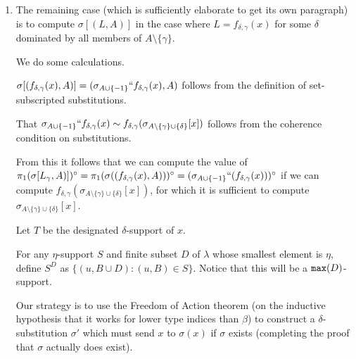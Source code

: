 \documentclass[12pt]{article}
\begin{document}
\begin{enumerate}
\item The remaining case (which is sufficiently elaborate to get its own paragraph)  is to compute $\sigma[(L,A)]$ in the case where $L = f_{\delta,\gamma}(x)$ for some $\delta$ dominated by all members of $A \setminus \{\gamma\}$.

We do some calculations.  

$\sigma[( f_{\delta,\gamma}(x),A)] = (\sigma_{A\cup \{-1\}}`` f_{\delta,\gamma}(x),A)$ follows from the definition of set-subscripted substitutions.

That $\sigma_{A\cup \{-1\}}`` f_{\delta,\gamma}(x) \sim f_{\delta,\gamma}(\sigma_{A\setminus \{\gamma\}\cup \{\delta\}}[x])$ follows from the coherence condition on substitutions.

From this it follows that we can compute the value of $\pi_1(\sigma[L_\gamma,A)])^\circ = \pi_1( \sigma((f_{\delta,\gamma}(x),A)))^\circ = (\sigma_{A\cup \{-1\}}``(f_{\delta,\gamma}(x)))^\circ$ if we can compute $f_{\delta,\gamma}(\sigma_{A \setminus \{\gamma\}\cup \{\delta\}}[x])$,
for which it is sufficient to compute $\sigma_{A \setminus \{\gamma\}\cup \{\delta\}}[x]$.

Let $T$ be the designated $\delta$-support of $x$.

For any $\eta$-support $S$ and finite subset $D$ of $\lambda$ whose smallest element is $\eta$, define $S^D$ as $\{(u,B \cup D):(u,B) \in S\}$.  Notice that this will be a ${\tt max}(D)$-support.

Our strategy is to use the Freedom of Action theorem (on the inductive hypothesis that it works for lower type indices than $\beta$) to construct a $\delta$-substitution $\sigma'$ which must send $x$ to $\sigma(x)$ if $\sigma$ exists (completing the proof that $\sigma$ actually does exist).


\end{enumerate}
\end{document}
